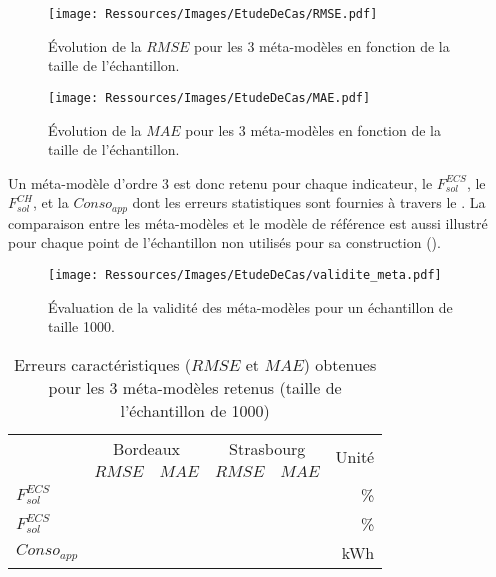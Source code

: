 \begin{figure}
    \centering
    \texttt{[image: Ressources/Images/EtudeDeCas/RMSE.pdf]}
    \caption[Évolution de la $RMSE$ en fonction de l’échantillon]
            {Évolution de la $RMSE$ pour les \num{3} méta-modèles
             en fonction de la taille de l’échantillon.}
    \label{fig:rmse}
\end{figure}

\begin{figure}
    \centering
    \texttt{[image: Ressources/Images/EtudeDeCas/MAE.pdf]}
    \caption[Évolution de la $MAE$ en fonction de l’échantillon]
            {Évolution de la $MAE$ pour les \num{3} méta-modèles
             en fonction de la taille de l’échantillon.}
    \label{fig:mae}
\end{figure}

Un méta-modèle d’ordre \num{3} est donc retenu pour chaque indicateur, le $F_{sol}^{ECS}$, le $F_{sol}^{CH}$,
et la $Conso_{app}$ dont les erreurs statistiques sont fournies à travers le .
La comparaison entre les méta-modèles et le modèle de référence est aussi illustré pour chaque
point de l’échantillon non utilisés pour sa construction ().

\begin{figure}
    \centering
    \texttt{[image: Ressources/Images/EtudeDeCas/validite\_meta.pdf]}
    \caption[Validité des méta-modèles]
            {Évaluation de la validité des méta-modèles pour un échantillon
             de taille \num{1000}.}
    \label{fig:validite_meta}
\end{figure}

\begin{table}
\centering
\caption{Erreurs caractéristiques ($RMSE$ et $MAE$) obtenues pour les \num{3} méta-modèles retenus
         (taille de l’échantillon de \num{1000})
\label{tab:meta_retenus}}
\begin{tabular}{l c c c c r}
    \toprule
                    & \multicolumn{2}{c}{Bordeaux} & \multicolumn{2}{c}{Strasbourg} & \multirow{2}{*}{Unité} \\
                    \cmidrule(r){2-3}
                    \cmidrule(r){4-5}
                    & $RMSE$ & $MAE$               & $RMSE$ & $MAE$                 &                        \\
    \midrule
    $F_{sol}^{ECS}$ &  & & & & \si{\percent} \\
    \addlinespace[\defaultaddspace]
    $F_{sol}^{ECS}$ &  & & & & \si{\percent} \\
    \addlinespace[\defaultaddspace]
    $Conso_{app}$   &  & & & & \si{kWh}      \\
    \bottomrule
\end{tabular}
\end{table}


